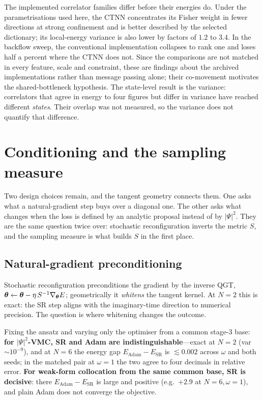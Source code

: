 \medskip
\noindent The implemented correlator families differ before their energies do. Under the
parametrisations used here, the CTNN concentrates its Fisher weight in fewer directions at
strong confinement and is better described by the selected dictionary; its local-energy
variance is also lower by factors of $1.2$ to $3.4$. In the backflow sweep, the conventional
implementation collapses to rank one and loses half a percent where the CTNN does not. Since
the comparisons are not matched in every feature, scale and constraint, these are findings
about the archived implementations rather than message passing alone; their co-movement
motivates the shared-bottleneck hypothesis. The state-level result is the variance:
correlators that agree in energy to four figures but differ in variance have reached
different \emph{states}. Their overlap was not measured, so the variance does not quantify
that difference.

\section{Conditioning and the sampling measure}
\label{sec:kernel-cond}
\label{sec:kernel-q2}

Two design choices remain, and the tangent geometry connects them. One asks what a
natural-gradient step buys over a diagonal one. The other asks what changes when the loss is
defined by an analytic proposal instead of by $|\Psi|^2$. They are the same question twice
over: stochastic reconfiguration inverts the metric $S$, and the sampling measure is what
builds $S$ in the first place.

\subsection{Natural-gradient preconditioning}
Stochastic reconfiguration preconditions the gradient by the inverse QGT,
$\bm{\theta} \leftarrow \bm{\theta} - \eta\, S^{-1}\nabla_{\bm{\theta}} E$; geometrically it \emph{whitens} the tangent
kernel. At $N=2$ this is exact: the SR step aligns with the imaginary-time direction
to numerical precision. The question is where whitening changes the outcome.

Fixing the ansatz and varying only the optimiser from a common stage-3 base:
\textbf{for $|\Psi|^2$-VMC, SR and Adam are indistinguishable}---exact at $N=2$
(var $\sim\!10^{-9}$), and at $N=6$ the energy gap
$E_{\mathrm{Adam}}-E_{\mathrm{SR}}$ is $\lesssim0.002$ across $\omega$ and both
seeds; in the matched pair at $\omega=1$ the two agree to four decimals in relative error.
\textbf{For weak-form collocation from the same common base, SR is decisive}: there
$E_{\mathrm{Adam}}-E_{\mathrm{SR}}$ is large and positive (e.g.\ $+2.9$ at
$N=6,\omega=1$), and plain Adam does not converge the objective.

